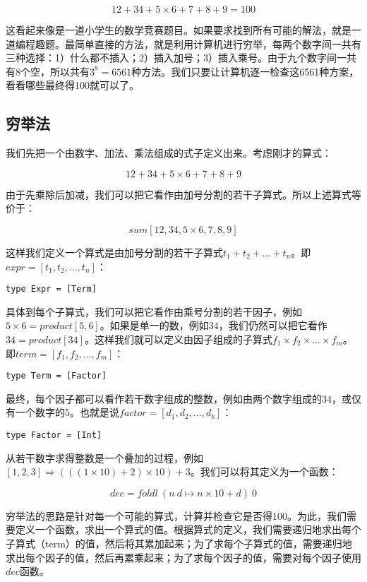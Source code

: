 \documentclass[b5paper]{ctexart}
\begin{document}
\[
12 + 34 + 5 \times 6 + 7 + 8 + 9 = 100
\]

这看起来像是一道小学生的数学竞赛题目。如果要求找到所有可能的解法，就是一道编程趣题。最简单直接的方法，就是利用计算机进行穷举，每两个数字间一共有三种选择：1）什么都不插入；2）插入加号；3）插入乘号。由于九个数字间一共有8个空，所以共有$3^8 = 6561$种方法。我们只要让计算机逐一检查这6561种方案，看看哪些最终得100就可以了。

\subsection{穷举法}

我们先把一个由数字、加法、乘法组成的式子定义出来。考虑刚才的算式：

\[
12 + 34 + 5 \times 6 + 7 + 8 + 9
\]

由于先乘除后加减，我们可以把它看作由加号分割的若干子算式。所以上述算式等价于：

\[
sum [12, 34, 5 \times 6, 7, 8, 9]
\]

这样我们定义一个算式是由加号分割的若干子算式$t_1 + t_2 + ... + t_n$。即$expr = [t_1, t_2, ..., t_n]$：

\lstset{frame = none}
\begin{lstlisting}
type Expr = [Term]
\end{lstlisting}

具体到每个子算式，我们可以把它看作由乘号分割的若干因子，例如$5 \times 6 = product [5, 6]$。如果是单一的数，例如$34$，我们仍然可以把它看作$34 = product [34]$。这样我们就可以定义由因子组成的子算式$f_1 \times f_2 \times ... \times f_m$。即$term = [f_1, f_2, ..., f_m]$：

\begin{lstlisting}
type Term = [Factor]
\end{lstlisting}

最终，每个因子都可以看作若干数字组成的整数，例如由两个数字组成的34，或仅有一个数字的5。也就是说$factor = [d_1, d_2, ..., d_k]$：

\begin{lstlisting}
type Factor = [Int]
\end{lstlisting}

从若干数字求得整数是一个叠加的过程，例如$[1, 2, 3] \Rightarrow (((1 \times 10) + 2) \times 10) + 3$。我们可以将其定义为一个函数：

\[
dec = foldl\ (n\ d \mapsto n \times 10 + d)\ 0
\]

穷举法的思路是针对每一个可能的算式，计算并检查它是否得100。为此，我们需要定义一个函数，求出一个算式的值。根据算式的定义，我们需要递归地求出每个子算式（term）的值，然后将其累加起来；为了求每个子算式的值，需要递归地求出每个因子的值，然后再累乘起来；为了求每个因子的值，需要对每个因子使用$dec$函数。
\end{document}
